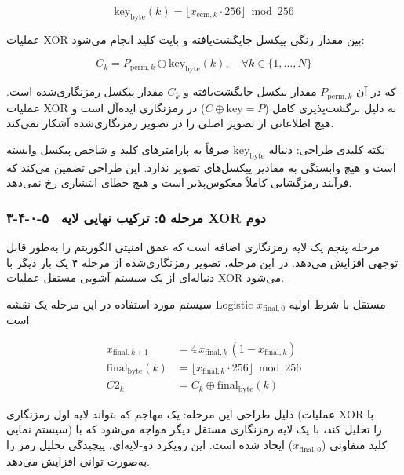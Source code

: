 \begin{equation}
\mathrm{key}_{\mathrm{byte}}(k) = \lfloor x_{\mathrm{ecm},k} \cdot 256 \rfloor \bmod 256
\label{eq:ch3-keybyte}
\end{equation}

عملیات ‎XOR‎ بین مقدار رنگی پیکسل جایگشت‌یافته و بایت کلید انجام می‌شود:

\begin{equation}
C_k = P_{\mathrm{perm},k} \oplus \mathrm{key}_{\mathrm{byte}}(k), \quad \forall k \in \{1,\ldots,N\}
\label{eq:ch3-xor}
\end{equation}

که در آن $P_{\mathrm{perm},k}$ مقدار پیکسل جایگشت‌یافته و $C_k$ مقدار پیکسل رمزنگاری‌شده است. عملیات ‎XOR‎ به دلیل برگشت‌پذیری کامل ($C \oplus \mathrm{key} = P$) در رمزنگاری ایده‌آل است و هیچ اطلاعاتی از تصویر اصلی را در تصویر رمزنگاری‌شده آشکار نمی‌کند.

نکته کلیدی طراحی: دنباله $\mathrm{key}_{\mathrm{byte}}$ صرفاً به پارامترهای کلید و شاخص پیکسل وابسته است و هیچ وابستگی به مقادیر پیکسل‌های تصویر ندارد. این طراحی تضمین می‌کند که فرآیند رمزگشایی کاملاً معکوس‌پذیر است و هیچ خطای انتشاری رخ نمی‌دهد\cite{ref6}.

\subsubsection{۳-۴-۰-۵  مرحله ۵: ترکیب نهایی لایه ‎XOR‎ دوم}

مرحله پنجم یک لایه رمزنگاری اضافه است که عمق امنیتی الگوریتم را به‌طور قابل توجهی افزایش می‌دهد. در این مرحله، تصویر رمزنگاری‌شده از مرحله ۴ یک بار دیگر با دنباله‌ای از یک سیستم آشوبی مستقل عملیات ‎XOR‎ می‌شود.

سیستم مورد استفاده در این مرحله یک نقشه ‎Logistic‎ مستقل با شرط اولیه $x_{\mathrm{final},0}$ است:

\begin{align}
x_{\mathrm{final},k+1} &= 4\,x_{\mathrm{final},k}\,(1-x_{\mathrm{final},k}) \\
\mathrm{final}_{\mathrm{byte}}(k) &= \lfloor x_{\mathrm{final},k} \cdot 256 \rfloor \bmod 256 \\
C2_k &= C_k \oplus \mathrm{final}_{\mathrm{byte}}(k)
\label{eq:ch3-xor-final}
\end{align}

دلیل طراحی این مرحله: یک مهاجم که بتواند لایه اول رمزنگاری (عملیات ‎XOR‎ با سیستم نمایی) را تحلیل کند، با یک لایه رمزنگاری مستقل دیگر مواجه می‌شود که با کلید متفاوتی ($x_{\mathrm{final},0}$) ایجاد شده است. این رویکرد دو-لایه‌ای، پیچیدگی تحلیل رمز را به‌صورت توانی افزایش می‌دهد.

